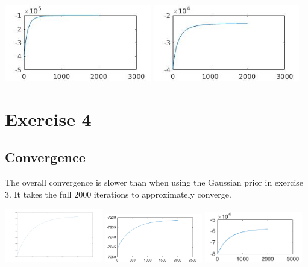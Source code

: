 \documentclass[a4paper,11pt, final]{scrartcl}
\begin{document}
{
\centering 
\includegraphics[width=0.48\textwidth]{ex3_image_gauss_mrf_posterior.jpg}
\includegraphics[width=0.48\textwidth]{ex3_image_median_into_gauss_mrf_posterior.jpg}
}

\section*{Exercise 4}
\subsection*{Convergence}
The overall convergence is slower than when using the Gaussian prior in exercise 3. It takes the full 2000 iterations to approximately converge. 

{
\centering 
\includegraphics[width=0.32\textwidth]{ex4_stripes_mrf_student_posterior.png}
\includegraphics[width=0.32\textwidth]{ex4_checker_mrf_student_posterior.png}
\includegraphics[width=0.32\textwidth]{ex4_image_mrf_student_posterior.png}
}
\end{document}
